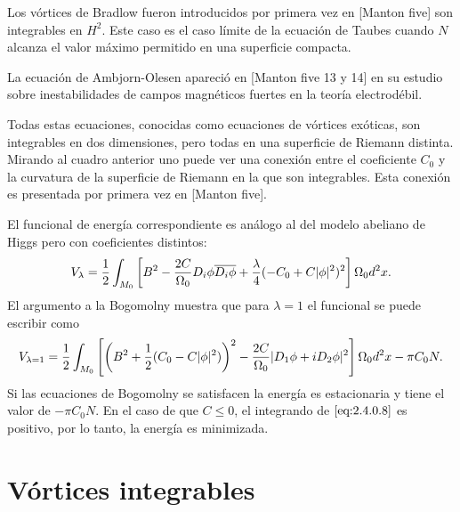 Los vórtices de Bradlow fueron introducidos por primera vez en [Manton five] son integrables en $H^2$. Este caso es el caso límite de la ecuación de Taubes cuando $N$ alcanza el valor máximo permitido en una superficie compacta.

La ecuación de Ambjorn-Olesen apareció en [Manton five 13 y 14] en su estudio sobre inestabilidades de campos magnéticos fuertes en la teoría electrodébil.

Todas estas ecuaciones, conocidas como ecuaciones de vórtices exóticas, son integrables en dos dimensiones, pero todas en una superficie de Riemann distinta. Mirando al cuadro anterior uno puede ver una conexión entre el coeficiente $C_0$ y la curvatura de la superficie de Riemann en la que son integrables. Esta conexión es presentada por primera vez en [Manton five].


El funcional de energía correspondiente es análogo al del modelo abeliano de Higgs pero con coeficientes distintos:
\begin{align}
    V_{\lambda} = \frac{1}{2}\int_{M_0}\left[B^2-\frac{2C}{\Omega_0}D_i\phi\overline{D_i\phi}+\frac{\lambda}{4}(-C_0+C|\phi|^2)^2\right]\Omega_0 d^2x. \label{eq:2.4.0.7}
\end{align}
El argumento a la Bogomolny muestra que para $\lambda=1$ el funcional se puede escribir como
\begin{align}
    V_{\lambda=1} = \frac{1}{2}\int_{M_0}\left[\left(B^2+\frac{1}{2}(C_0-C|\phi|^2)\right)^2-\frac{2C}{\Omega_0}|D_1\phi+iD_2\phi|^2\right]\Omega_0 d^2x-\pi C_0 N. \label{eq:2.4.0.8}
\end{align}
Si las ecuaciones de Bogomolny se satisfacen la energía es estacionaria y tiene el valor de $-\pi C_0 N$. En el caso de que $C\leq 0$, el integrando de $\eqref{eq:2.4.0.8}$ es positivo, por lo tanto, la energía es minimizada.

\section{Vórtices integrables}

